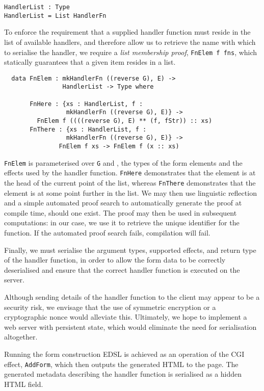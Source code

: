 \documentclass[preprint]{sigplanconf}
\begin{document}
\begin{Verbatim}
HandlerList : Type
HandlerList = List HandlerFn
\end{Verbatim}
To enforce the requirement that a supplied handler function must reside in the list of available handlers, and therefore allow us to retrieve the name with which to serialise the handler, we require a \textit{list membership proof},  \texttt{FnElem f fns}, which statically guarantees that a given item resides in a list.
\begin{Verbatim}
  data FnElem : mkHandlerFn ((reverse G), E) -> 
                HandlerList -> Type where
                
       FnHere : {xs : HandlerList, f : 
                 mkHandlerFn ((reverse G), E)} ->
         FnElem f ((((reverse G), E) ** (f, fStr)) :: xs)
       FnThere : {xs : HandlerList, f : 
                 mkHandlerFn ((reverse G), E)} ->
               FnElem f xs -> FnElem f (x :: xs)
\end{Verbatim}
\texttt{FnElem} is parameterised over \texttt{G} and , the types of the form elements and the effects used by the handler function. \texttt{FnHere} demonstrates that the element is at the head of the current point of the list, whereas \texttt{FnThere} demonstrates that the element is at some point further in the list. %
We may then use linguistic reflection and a simple automated proof search to automatically generate the proof at compile time, should one exist. The proof may then be used in subsequent computations: in our case, we use it to retrieve the unique identifier for the function. If the automated proof search fails, compilation will fail.

Finally, we must serialise the argument types, supported effects, and return type of the handler function, in order to allow the form data to be correctly deserialised and ensure that the correct handler function is executed on the server. 

Although sending details of the handler function to the client may appear to be a security risk, we envisage that the use of symmetric encryption or a cryptographic nonce would alleviate this. Ultimately, we hope to implement a web server with persistent state, which would eliminate the need for serialisation altogether.

Running the form construction EDSL is achieved as an operation of the CGI effect, \texttt{AddForm}, which then outputs the generated HTML to the page. The generated metadata describing the handler function is serialised as a hidden HTML field.
\end{document}
